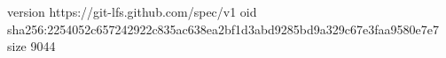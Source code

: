 version https://git-lfs.github.com/spec/v1
oid sha256:2254052c657242922c835ac638ea2bf1d3abd9285bd9a329c67e3faa9580e7e7
size 9044
